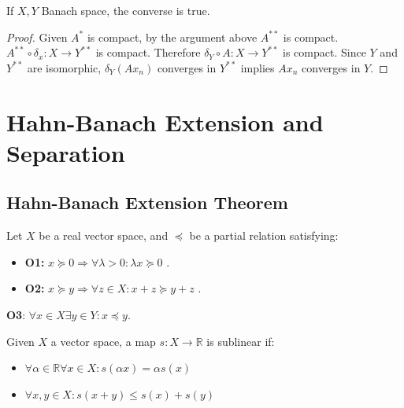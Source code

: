 \begin{corollary}
	If $X, Y$ Banach space, the converse is true.
\end{corollary}
\begin{proof}
	Given $A^*$ is compact, by the argument above $A^{**}$ is compact. $A^{**} \circ \delta_x: X \rightarrow Y^{**}$ is compact. Therefore $\delta_Y\circ A: X \rightarrow Y^{**} $ is compact. Since $Y$ and $Y^{**}$ are isomorphic, $\delta_Y(Ax_n)$ converges in $Y^{**}$ implies $Ax_n$ converges in $Y$. 
\end{proof}
\newpage




\newpage
\section{Hahn-Banach Extension and Separation}
\subsection{Hahn-Banach Extension Theorem}
\begin{definition}
	Let $X$ be a real vector space, and $\preccurlyeq$ be a partial relation satisfying:
	\begin{itemize}
		\item \textbf{O1:} $x \succcurlyeq 0 \Rightarrow \forall \lambda > 0: \lambda x \succcurlyeq 0$ . 
		\item \textbf{O2:} $x \succcurlyeq y \Rightarrow \forall z \in X: x + z \succcurlyeq y + z$ . 
	\end{itemize} 
\end{definition}

\begin{theorem}
	\textbf{O3}: $\forall x \in X \exists y \in Y: x \preccurlyeq y$. 
\end{theorem}

\begin{definition}
	Given $X$ a vector space, a map $s: X \rightarrow \mathbb{R}$ is sublinear if:
	\begin{itemize}
		\item $\forall \alpha \in \mathbb{R} \forall x \in X : s(\alpha x) = \alpha s(x)$
		\item $\forall x, y \in X: s(x + y) \leq s(x) + s(y)$ 
	\end{itemize}
\end{definition}


